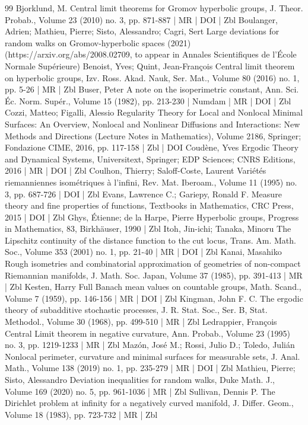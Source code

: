 \begin{thebibliography}{99}
Bjorklund, M. Central limit theorems for Gromov hyperbolic groups, J. Theor. Probab., Volume 23 (2010) no. 3, pp. 871-887 | MR | DOI | Zbl
Boulanger, Adrien; Mathieu, Pierre; Sisto, Alessandro; Cagri, Sert Large deviations for random walks on Gromov-hyperbolic spaces (2021) (https://arxiv.org/abs/2008.02709, to appear in Annales Scientifiques de l’École Normale Supérieure)
Benoist, Yves; Quint, Jean-François Central limit theorem on hyperbolic groups, Izv. Ross. Akad. Nauk, Ser. Mat., Volume 80 (2016) no. 1, pp. 5-26 | MR | Zbl
Buser, Peter A note on the isoperimetric constant, Ann. Sci. Éc. Norm. Supér., Volume 15 (1982), pp. 213-230 | Numdam | MR | DOI | Zbl
Cozzi, Matteo; Figalli, Alessio Regularity Theory for Local and Nonlocal Minimal Surfaces: An Overview, Nonlocal and Nonlinear Diffusions and Interactions: New Methods and Directions (Lecture Notes in Mathematics), Volume 2186, Springer; Fondazione CIME, 2016, pp. 117-158 | Zbl | DOI
Coudène, Yves Ergodic Theory and Dynamical Systems, Universitext, Springer; EDP Sciences; CNRS Editions, 2016 | MR | DOI | Zbl
Coulhon, Thierry; Saloff-Coste, Laurent Variétés riemanniennes isométriques à l’infini, Rev. Mat. Iberoam., Volume 11 (1995) no. 3, pp. 687-726 | DOI | Zbl
Evans, Lawrence C.; Gariepy, Ronald F. Measure theory and fine properties of functions, Textbooks in Mathematics, CRC Press, 2015 | DOI | Zbl
Ghys, Étienne; de la Harpe, Pierre Hyperbolic groups, Progress in Mathematics, 83, Birkhäuser, 1990 | Zbl
Itoh, Jin-ichi; Tanaka, Minoru The Lipschitz continuity of the distance function to the cut locus, Trans. Am. Math. Soc., Volume 353 (2001) no. 1, pp. 21-40 | MR | DOI | Zbl
Kanai, Masahiko Rough isometries and combinatorial approximation of geometries of non-compact Riemannian manifolds, J. Math. Soc. Japan, Volume 37 (1985), pp. 391-413 | MR | Zbl
Kesten, Harry Full Banach mean values on countable groups, Math. Scand., Volume 7 (1959), pp. 146-156 | MR | DOI | Zbl
Kingman, John F. C. The ergodic theory of subadditive stochastic processes, J. R. Stat. Soc., Ser. B, Stat. Methodol., Volume 30 (1968), pp. 499-510 | MR | Zbl
Ledrappier, François Central Limit theorem in negative curvature, Ann. Probab., Volume 23 (1995) no. 3, pp. 1219-1233 | MR | Zbl
Mazón, José M.; Rossi, Julio D.; Toledo, Julián Nonlocal perimeter, curvature and minimal surfaces for measurable sets, J. Anal. Math., Volume 138 (2019) no. 1, pp. 235-279 | MR | DOI | Zbl
Mathieu, Pierre; Sisto, Alessandro Deviation inequalities for random walks, Duke Math. J., Volume 169 (2020) no. 5, pp. 961-1036 | MR | Zbl
Sullivan, Dennis P. The Dirichlet problem at infinity for a negatively curved manifold, J. Differ. Geom., Volume 18 (1983), pp. 723-732 | MR | Zbl
\end{thebibliography}
